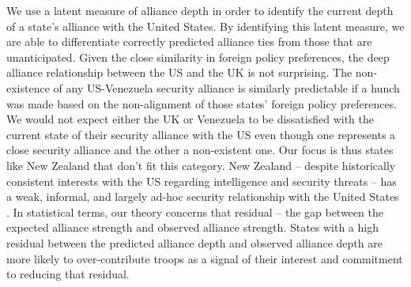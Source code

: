 \documentclass[12pt,letterpaper]{article}
\begin{document}
		We use a latent measure of alliance depth in order to identify the current depth of a state's alliance with the United States. By identifying this latent measure, we are able
		to differentiate correctly predicted alliance ties from those that are unanticipated. Given the close similarity in foreign policy preferences, the deep alliance relationship between the US and the UK is not surprising. The non-existence of any US-Venezuela security alliance is similarly predictable if a hunch was made based on the non-alignment of those states' foreign policy preferences. We would not expect either the UK or Venezuela to be dissatisfied with the current state of their security alliance with the US even though one represents a close security alliance and the other a non-existent one. Our focus is thus states like New Zealand that don't fit this category. New Zealand -- despite historically consistent interests with the US regarding intelligence and security threats -- has a weak, informal, and largely ad-hoc security relationship with the United States \citep{fruhling_anzusreallyalliance_2018}. In statistical terms, our theory concerns that residual -- the gap between the expected alliance strength and observed alliance strength. States with a high residual between the predicted alliance depth and observed alliance depth are more likely to over-contribute troops as a signal of their interest and commitment to reducing that residual.
		
\end{document}
